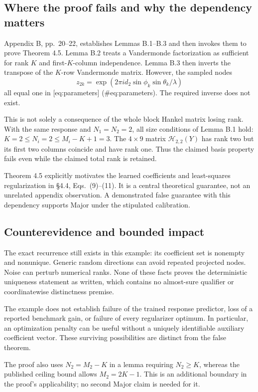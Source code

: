 \documentclass[10pt]{article}
\begin{document}
\subsection*{Where the proof fails and why the dependency matters}
Appendix B, pp. 20–22, establishes Lemmas B.1–B.3 and then invokes them to prove Theorem 4.5. Lemma B.2 treats a Vandermonde factorization as sufficient for rank \(K\) and first-\(K\)-column independence. Lemma B.3 then inverts the transpose of the \(K\)-row Vandermonde matrix. However, the sampled nodes \[z_{2k}=\exp(2\pi i d_2\sin\phi_k\sin\theta_k/\lambda)\] all equal one in [eq:parameters] (\#eq:parameters). The required inverse does not exist.\par
This is not solely a consequence of the whole block Hankel matrix losing rank. With the same response and \(N_1=N_2=2\), all size conditions of Lemma B.1 hold: \(K=2\leq N_i=2\leq M_i-K+1=3\). The \(4\times9\) matrix \(\mathcal H_{2,2}(Y)\) has rank two but its first two columns coincide and have rank one. Thus the claimed basis property fails even while the claimed total rank is retained.\par
Theorem 4.5 explicitly motivates the learned coefficients and least-squares regularization in §4.4, Eqs. (9)–(11). It is a central theoretical guarantee, not an unrelated appendix observation. A demonstrated false guarantee with this dependency supports Major under the stipulated calibration.\par
\subsection*{Counterevidence and bounded impact}
The exact recurrence still exists in this example: its coefficient set is nonempty and nonunique. Generic random directions can avoid repeated projected nodes. Noise can perturb numerical ranks. None of these facts proves the deterministic uniqueness statement as written, which contains no almost-sure qualifier or coordinatewise distinctness premise.\par
The example does not establish failure of the trained response predictor, loss of a reported benchmark gain, or failure of every regularizer optimum. In particular, an optimization penalty can be useful without a uniquely identifiable auxiliary coefficient vector. These surviving possibilities are distinct from the false theorem.\par
The proof also uses \(N_2=M_2-K\) in a lemma requiring \(N_2\geq K\), whereas the published ceiling bound allows \(M_2=2K-1\). This is an additional boundary in the proof’s applicability; no second Major claim is needed for it.\par
\end{document}

